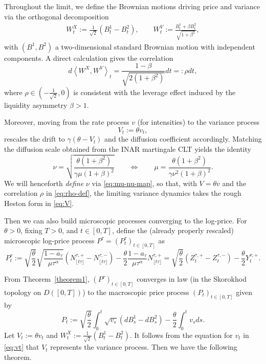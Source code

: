\documentclass[letterpaper]{article}
\numberwithin{equation}{section}
\theoremstyle{definition}
\theoremstyle{remark}
\begin{document}
Throughout the limit, we define the Brownian motions driving price and variance via the orthogonal decomposition
\begin{align}
W_t^X := \frac{1}{\sqrt{2}}\left(B_t^1-B_t^2\right),
\qquad
W_t^V := \frac{B_t^1+\beta B_t^2}{\sqrt{1+\beta^2}},\label{eq:wtxv}
\end{align}
with $(B^1,B^2)$ a two-dimensional standard Brownian motion with independent components. A direct calculation gives the correlation
\begin{equation}\label{eq:rho-def}
  d\left\langle W^X,W^V\right\rangle_t
  =\frac{1-\beta}{\sqrt{2(1+\beta^2)}}dt
  =:\rho dt,
\end{equation}
where $\rho\in\left(-\frac1{\sqrt2},0\right)$ is consistent with the leverage effect induced by the liquidity asymmetry $\beta>1$.

Moreover, moving from the rate process $v$ (for intensities) to the variance process
\[
  V_t := \theta v_t,
\]
rescales the drift to $\gamma(\theta-V_t)$ and the diffusion coefficient accordingly. Matching the diffusion scale obtained from the INAR martingale CLT yields the identity
\begin{equation}\label{eq:mu-nu-map}
  \nu = \sqrt{\frac{\theta(1+\beta^2)}{\gamma\mu(1+\beta)^2}}
  \qquad\Longleftrightarrow\qquad
  \mu = \frac{\theta(1+\beta^2)}{\gamma\nu^2(1+\beta)^2}.
\end{equation}
We will henceforth \emph{define} $\nu$ via \eqref{eq:mu-nu-map}, so that, with $V=\theta v$ and the correlation $\rho$ in \eqref{eq:rho-def}, the limiting variance dynamics takes the rough Heston form in \eqref{eq:V}.

Then we can also build microscopic processes converging to the log-price. %
For $\theta>0$, fixing $T>0$, and $t\in[0,T]$, define the (already properly rescaled) microscopic log-price process $P^\tau=(P_t^\tau)_{t\in[0,T]}$ as
\[
  P_t^{\tau}
  :=\sqrt{\frac{\theta}{2}}\sqrt{\frac{1-a_{\tau}}{\mu \tau^\alpha}}
    \left( N_{\lfloor t \tau \rfloor}^{\tau,+}-N_{\lfloor t \tau \rfloor}^{\tau,-} \right)
   -\frac{\theta}{2}\frac{1-a_{\tau}}{\mu \tau^\alpha}
    N_{\lfloor t \tau \rfloor}^{\tau,+}
  =\sqrt{\frac{\theta}{2}}\left(Z_{t}^{\tau,+}-Z_{t}^{\tau,-}\right)
   -\frac{\theta}{2}Y_{t}^{\tau,+}.
\]

From Theorem~\ref{theorem1}, $(P^{\tau})_{t\in[0,T]}$ converges in law (in the Skorokhod topology on $D([0,T])$) to the macroscopic price process $(P_t)_{t\in[0,T]}$ given by
\[
 P_t := \sqrt{\frac\theta2}\int_0^t\sqrt{v_s}\left(dB_s^1-dB_s^2\right)-\frac\theta2\int_0^t v_sds.
\]
Let $V_t:=\theta v_t$ and $W_t^X:=\frac{1}{\sqrt{2}}(B_t^1-B_t^2)$. 
It follows from the equation for $v_t$ in \eqref{eq:vt} that $V_t$ represents the variance process. 
Then we have the following theorem.
\end{document}
